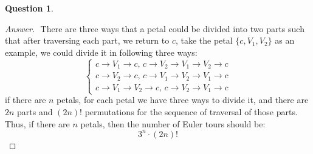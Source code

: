 \documentclass{article}
\theoremstyle{plain}
\newtheorem{question}{Question}
\newenvironment{answer}[1][Answer]
    {\begin{proof}[#1]{$ $}\renewcommand\qedsymbol{$\vartriangle$}}
    {\end{proof}}
\begin{document}
\begin{question}
\end{question}
\begin{answer}
    There are three ways that a petal could be divided into two parts such that after traversing each part, we return to $c$, take the petal $\{ c, V_1, V_2 \}$ as an example, we could divide it in following three ways:
    \begin{equation*}
        \left\{\begin{array}{l}
        c \rightarrow V_1 \rightarrow c,\,c \rightarrow V_2 \rightarrow V_1 \rightarrow V_2 \rightarrow c\\
        c \rightarrow V_2 \rightarrow c,\,c \rightarrow V_1 \rightarrow V_2 \rightarrow V_1 \rightarrow c\\
        c \rightarrow V_1 \rightarrow V_2 \rightarrow c,\,c \rightarrow V_2 \rightarrow V_1 \rightarrow c
        \end{array}\right.
    \end{equation*}
    if there are $n$ petals, for each petal we have three ways to divide it, and there are $2n$ parts and $(2n)!$ permutations for the sequence of traversal of those parts. \\
    Thus, if there are $n$ petals, then the number of Euler tours should be:
    \begin{equation*}
        3^{n} \cdot(2 n) !
    \end{equation*}
    \end{answer}
\end{document}
